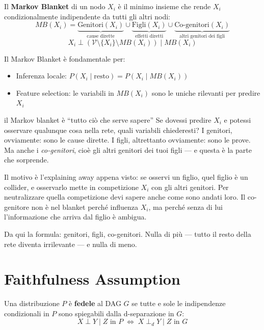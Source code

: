 \begin{definition}
Il \textbf{Markov Blanket} di un nodo $X_i$ è il minimo insieme che rende $X_i$ condizionalmente indipendente da tutti gli altri nodi:
\[
MB(X_i) = \underbrace{\text{Genitori}(X_i)}_{\text{cause dirette}} \cup \underbrace{\text{Figli}(X_i)}_{\text{effetti diretti}} \cup \underbrace{\text{Co-genitori}(X_i)}_{\text{altri genitori dei figli}}
\]
\[
X_i \perp (\mathcal{V} \setminus \{X_i\} \setminus MB(X_i)) \mid MB(X_i)
\]
\end{definition}

Il Markov Blanket è fondamentale per:
\begin{itemize}
    \item Inferenza locale: $P(X_i \mid \text{resto}) = P(X_i \mid MB(X_i))$
    \item Feature selection: le variabili in $MB(X_i)$ sono le uniche rilevanti per predire $X_i$
\end{itemize}

\begin{intuizione}{il Markov blanket è ``tutto ciò che serve sapere''}
Se dovessi predire $X_i$ e potessi osservare qualunque cosa nella rete, quali variabili chiederesti? I genitori, ovviamente: sono le cause dirette. I figli, altrettanto ovviamente: sono le prove. Ma anche i \emph{co-genitori}, cioè gli altri genitori dei tuoi figli — e questa è la parte che sorprende.

Il motivo è l'explaining away appena visto: se osservi un figlio, quel figlio è un collider, e osservarlo mette in competizione $X_i$ con gli altri genitori. Per neutralizzare quella competizione devi sapere anche come sono andati loro. Il co-genitore non è nel blanket perché influenza $X_i$, ma perché senza di lui l'informazione che arriva dal figlio è ambigua.

Da qui la formula: genitori, figli, co-genitori. Nulla di più — tutto il resto della rete diventa irrilevante — e nulla di meno.
\end{intuizione}

\section{Faithfulness Assumption}

\begin{definition}
Una distribuzione $P$ è \textbf{fedele} al DAG $G$ se tutte e sole le indipendenze condizionali in $P$ sono spiegabili dalla d-separazione in $G$:
\[X \perp Y \mid Z \text{ in } P \;\Leftrightarrow\; X \perp_d Y \mid Z \text{ in } G\]
\end{definition}

